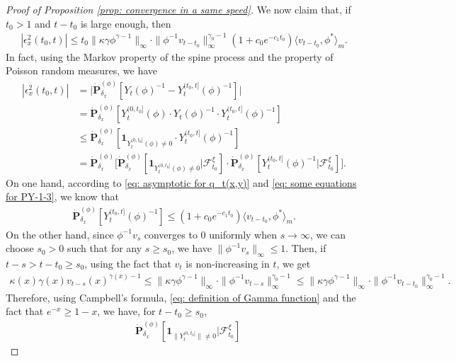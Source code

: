 \documentclass[UTF8]{pkuthss}
\theoremstyle{plain}
\theoremstyle{definition}
\numberwithin{equation}{section}
\begin{document}
\begin{proof}[Proof of Proposition \ref{prop: convergence in a same speed}]
	We now claim that, if $t_0 > 1$ and $t-t_0$ is large enough, then
\begin{align}\label{eq:upperbound_of_epsilon-2}
	|\epsilon_x^2(t_0,t)|
	\leq t_0\|\kappa\gamma\phi^{\gamma - 1}\|_{\infty} \cdot \|\phi^{-1}v_{t-t_0}\|^{\gamma_0-1}_\infty (1+c_0 e^{-c_1 t_0}) \langle v_{t-t_0},\phi^* \rangle_m.
\end{align}
	In fact, using the Markov property of the spine process and the property of Poisson random measures, we have
\begin{align}\label{eq:epsilon-22}
	|\epsilon_x^2(t_0,t)|
	&= \big| \dot{\mathbf P}_{\delta_x}^{(\phi)}[Y_t(\phi)^{-1} - Y^{(t_0,t]}_t(\phi)^{-1}] \big|
	\\&= \dot{\mathbf P}_{\delta_x}^{(\phi)}[Y_t^{(0,t_0]}(\phi)\cdot Y_t(\phi)^{-1}\cdot Y^{(t_0,t]}_t(\phi)^{-1}]
	\\&\leq \dot{\mathbf P}_{\delta_x}^{(\phi)}[\mathbf 1_{Y_t^{(0,t_0]}(\phi)\neq 0}\cdot Y^{(t_0,t]}_t(\phi)^{-1}]
	\\&= \dot{\mathbf P}_{\delta_x}^{(\phi)} \big[\dot{\mathbf P}_{\delta_x}^{(\phi)}[\mathbf 1_{Y_t^{(0,t_0]}(\phi)\neq 0}|\mathscr F^\xi_{t_0}] \cdot \dot{\mathbf P}_{\delta_x}^{(\phi)} [ Y^{(t_0,t]}_t(\phi)^{-1}|\mathscr F^\xi_{t_0}] \big].
\end{align}
	On one hand, according to \eqref{eq: asymptotic for q_t(x,y)} and \eqref{eq: some equations for PY-1-3}, we know that
\begin{align}\label{eq:epsilon-2-final2}
	\dot{\mathbf P}_{\delta_x}^{(\phi)}[ Y^{(t_0,t]}_t(\phi)^{-1}]
	\leq (1+c_0 e^{-c_1 t_0}) \langle v_{t-t_0},\phi^* \rangle_m.
\end{align}
	On the other hand, since $\phi^{-1}v_s$ converges to $0$ uniformly when $s\to \infty$, we can choose  $s_0>0$ such that for any $s\geq s_0$, we have $\|\phi^{-1}v_s\|_{\infty} \leq 1$.
	Then, if $t-s > t-t_0 \geq s_0$,
	using the fact that $v_t$ is non-increasing in $t$, we get
\begin{align}
	\kappa(x)\gamma(x) v_{t-s}(x)^{\gamma(x)-1}
	\leq \|\kappa \gamma \phi^{\gamma - 1}\|_\infty \cdot \|\phi^{-1} v_{t-s}\|^{\gamma_0-1}_\infty
	\leq \|\kappa\gamma\phi^{\gamma - 1}\|_\infty \cdot \|\phi^{-1}v_{t-t_0}\|^{\gamma_0-1}_\infty.
\end{align}
	Therefore, using Campbell's formula, \eqref{eq: definition of Gamma function} and the fact that $e^{-x} \geq 1-x$, we have,  for $t-t_0 \geq s_0$,
\begin{align}
	&\dot{\mathbf P}_{\delta_x}^{(\phi)}[\mathbf 1_{\| Y_t^{(0,t_0]}\|\neq 0}|\mathscr F^\xi_{t_0}]

\end{align}
\end{proof}
\end{document}
